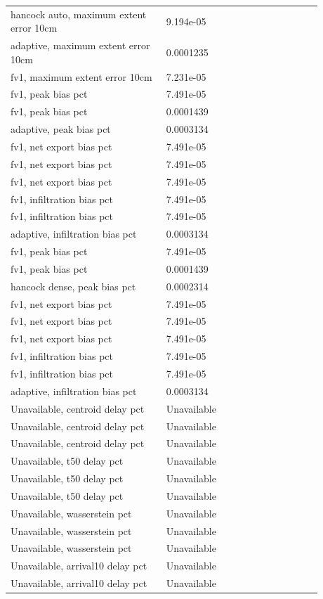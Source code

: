\begin{longtable}{p{0.4400\linewidth}p{0.4400\linewidth}}
hancock auto, maximum extent error 10cm & 9.194e-05 \\
adaptive, maximum extent error 10cm & 0.0001235 \\
fv1, maximum extent error 10cm & 7.231e-05 \\
fv1, peak bias pct & 7.491e-05 \\
fv1, peak bias pct & 0.0001439 \\
adaptive, peak bias pct & 0.0003134 \\
fv1, net export bias pct & 7.491e-05 \\
fv1, net export bias pct & 7.491e-05 \\
fv1, net export bias pct & 7.491e-05 \\
fv1, infiltration bias pct & 7.491e-05 \\
fv1, infiltration bias pct & 7.491e-05 \\
adaptive, infiltration bias pct & 0.0003134 \\
fv1, peak bias pct & 7.491e-05 \\
fv1, peak bias pct & 0.0001439 \\
hancock dense, peak bias pct & 0.0002314 \\
fv1, net export bias pct & 7.491e-05 \\
fv1, net export bias pct & 7.491e-05 \\
fv1, net export bias pct & 7.491e-05 \\
fv1, infiltration bias pct & 7.491e-05 \\
fv1, infiltration bias pct & 7.491e-05 \\
adaptive, infiltration bias pct & 0.0003134 \\
Unavailable, centroid delay pct & Unavailable \\
Unavailable, centroid delay pct & Unavailable \\
Unavailable, centroid delay pct & Unavailable \\
Unavailable, t50 delay pct & Unavailable \\
Unavailable, t50 delay pct & Unavailable \\
Unavailable, t50 delay pct & Unavailable \\
Unavailable, wasserstein pct & Unavailable \\
Unavailable, wasserstein pct & Unavailable \\
Unavailable, wasserstein pct & Unavailable \\
Unavailable, arrival10 delay pct & Unavailable \\
Unavailable, arrival10 delay pct & Unavailable \\

\end{longtable}
